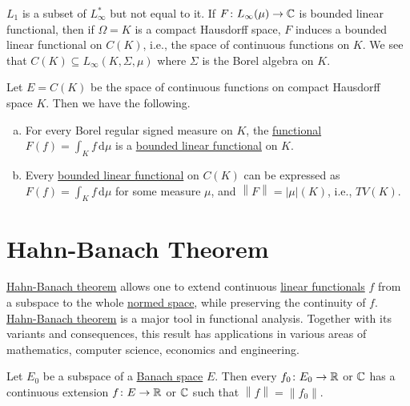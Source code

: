\begin{remark}
	\(L_1\) is a subset of \(L_{\infty}^{\ast}\) but not equal to it. If \(F\colon L_{\infty} (\mu )\to \mathbb{\MakeUppercase{c}} \) is bounded linear functional, then if \(\Omega = K\) is a compact Hausdorff space, \(F\) induces a bounded linear functional on \(C(K)\), i.e., the space of continuous functions on \(K\). We see that \(C(K)\subseteq L_{\infty} (K, \Sigma , \mu )\) where \(\Sigma \) is the Borel algebra on \(K\).
\end{remark}

\begin{theorem}
	Let \(E = C(K)\) be the space of continuous functions on compact Hausdorff space \(K\). Then we have the following.
	\begin{enumerate}[(a)]
		\item For every Borel regular signed measure on \(K\), the \hyperref[def:linear-functional]{functional} \(F(f) = \int _K f\,\mathrm{d} \mu \) is a \hyperref[def:bounded-linear-functional]{bounded linear functional} on \(K\).
		\item Every \hyperref[def:bounded-linear-functional]{bounded linear functional} on \(C(K)\) can be expressed as \(F(f) = \int _K f\,\mathrm{d} \mu \) for some measure \(\mu \), and \(\left\lVert F\right\rVert = \left\vert \mu  \right\vert (K) \), i.e., \(TV(K)\).
	\end{enumerate}
\end{theorem}

\section{Hahn-Banach Theorem}
\hyperref[thm:Hahn-Banach]{Hahn-Banach theorem} allows one to extend continuous \hyperref[def:linear-functional]{linear functionals} \(f\) from a subspace to the whole \hyperref[def:normed-vector-space]{normed space}, while preserving the continuity of \(f\). \hyperref[thm:Hahn-Banach]{Hahn-Banach theorem} is a major tool in functional analysis. Together with its variants and consequences, this result has applications in various areas of mathematics, computer science, economics and engineering.

\begin{theorem}\label{thm:Hahn-Banach}
	Let \(E_0\) be a subspace of a \hyperref[def:Banach-space]{Banach space} \(E\). Then every \(f_0 \colon E_0 \to \mathbb{\MakeUppercase{r}} \) or \(\mathbb{\MakeUppercase{c}} \) has a continuous extension \(f\colon E\to \mathbb{\MakeUppercase{r}} \) or \(\mathbb{\MakeUppercase{c}} \) such that \(\left\lVert f\right\rVert = \left\lVert f_0\right\rVert.\)
\end{theorem}

